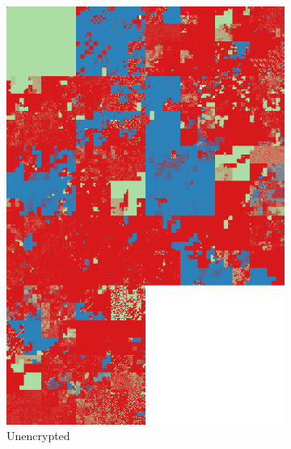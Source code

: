 \documentclass[
  digital, %
  color,   %
  oneside, %
  lof,     %
  nolot,     %
]{fithesis4}
\begin{document}
\begin{figure}
    \centering
    \begin{subfigure}[t]{.32\textwidth}
        \centering
        \includegraphics[width=\textwidth,interpolate=false]{ubnt-unencrypted-test-chi2-4-hilbert.png}
        \caption{Unencrypted}
        \label{fig:bad-enc-unenc}
    \end{subfigure}
    \hfill
    \begin{subfigure}[t]{.32\textwidth}
        \centering

\end{subfigure}
\end{figure}
\end{document}
